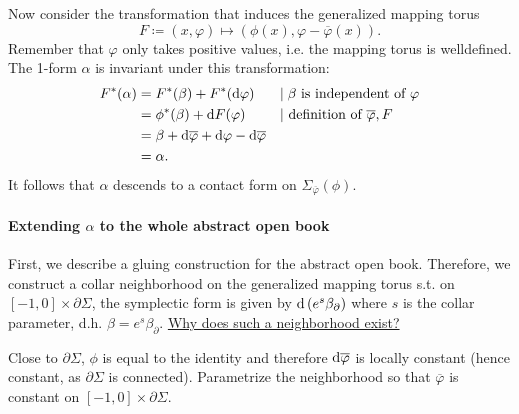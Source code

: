 Now consider the transformation that induces the generalized mapping torus
\[
    F \coloneqq (x,\varphi) \mapsto (\phi(x), \varphi - \overline{\varphi}(x)).    
\]
Remember that $\varphi$ only takes positive values, i.e. the mapping torus is welldefined.
The 1-form $\alpha$ is invariant under this transformation:
\begin{align*}
    F^*(\alpha) &= F^*(\beta) + F^*(\mathrm{d} \varphi)&&|\;\beta\text{ is independent of }\varphi\\
    &= \phi^*(\beta) + \mathrm{d} F(\varphi)&&|\text{ definition of }\overline{\varphi}, F\\
    &= \beta + \mathrm{d}\overline{\varphi} + \mathrm{d} \varphi - \mathrm{d} \overline{\varphi}\\
    &= \alpha.
\end{align*}
It follows that $\alpha$ descends to a contact form on $\Sigma_{\overline{\varphi}}(\phi)$. 

\paragraph*{Extending $\alpha$ to the whole abstract open book}

First, we describe a gluing construction for the abstract open book.
Therefore, we construct a collar neighborhood on the generalized mapping torus s.t. on $[-1,0] \times \partial \Sigma$, the symplectic form is given by $\mathrm{d} \left(e^s\beta_\partial\right)$ where $s$ is the collar parameter, d.h. $\beta = e^s\beta_\partial$.
\underline{Why does such a neighborhood exist?}

Close to $\partial \Sigma$, $\phi$ is equal to the identity and therefore $\mathrm{d} \overline{\varphi}$ is locally constant (hence constant, as $\partial \Sigma$ is connected).
Parametrize the neighborhood so that $\overline{\varphi}$ is constant on $[-1,0]\times \partial \Sigma$.


